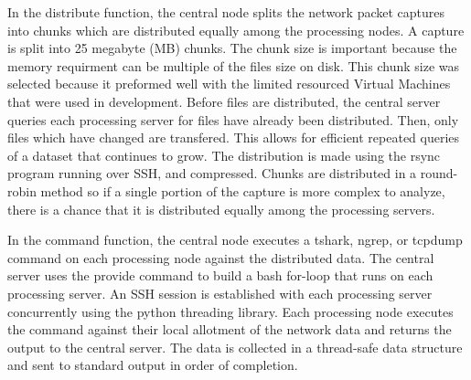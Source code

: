 \documentclass{article}
\begin{document}
\begin{multicols}{2}
In the distribute function,  the central node splits the network packet captures into chunks which are distributed equally among the processing nodes.  A capture is split into 25 megabyte (MB) chunks. The chunk size is important because the memory requirment can be multiple of the files size on disk. This chunk size was selected because it preformed well with the limited resourced Virtual Machines that were used in development.  Before files are distributed, the central server queries each processing server for files have already been distributed. Then, only files which have changed are transfered.  This allows for efficient repeated queries of a dataset that continues to grow. The distribution is made using the rsync program running over SSH, and compressed.  Chunks are distributed in a round-robin method so if a single portion of the capture is more complex to analyze, there is a chance that it is distributed equally among the processing servers.      

In the command function, the central node executes a tshark, ngrep, or tcpdump command on each processing node against the distributed data. The central server uses the provide command to build a bash for-loop that runs on each processing server. An SSH session is established with each processing server concurrently using the python threading library.  Each processing node executes the command against their local allotment of the network data and returns the output to the central server. The data is collected in a thread-safe data structure and sent to standard output in order of completion.


\end{multicols}
\end{document}
